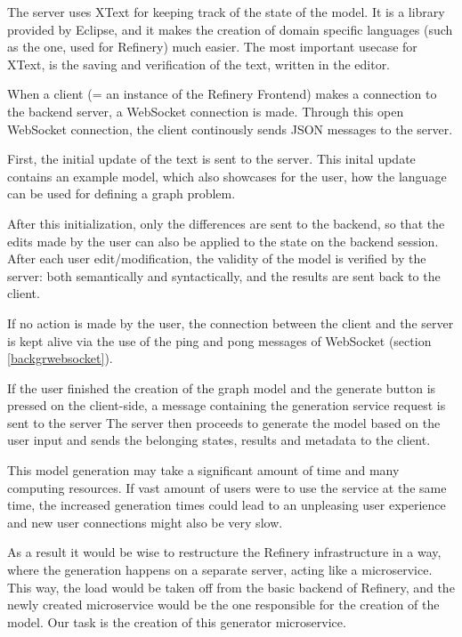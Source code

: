 	The server uses XText for keeping track of the state of the model. It is a library provided
	by Eclipse, and it makes the creation of domain specific languages (such as the one, used for Refinery)
	much easier. The most important usecase for XText, is the saving and verification of the text, 
	written in the editor.

	When a client (= an instance of the Refinery Frontend) makes a connection to the backend server, a WebSocket 
	connection is made. Through this open WebSocket connection, the client continously sends JSON messages to
	the server.

	First, the initial update of the text is sent to the server.
	This inital update contains an example model, which also showcases for the user, how the language can be used
	for defining a graph problem. 
	
	After this initialization, only the differences are sent to the backend, so that 
	the edits made by the user can also be applied to the state on the backend session. 
	After each user edit/modification, the
	validity of the model is verified by the server: both semantically and syntactically, and the results are 
	sent back to the client.

	If no action is made by the user, the connection between the client and the server
	is kept alive via the use of the ping and pong messages of WebSocket (section \ref{backgrwebsocket}).

	If the user finished the creation of the graph model and the generate button is pressed 
	on the client-side, a message containing the generation service request is sent to the server 
	The server then proceeds to generate the model based on the user input and sends the belonging 
	states, results and metadata to the client.

	This model generation may take a significant amount of time and many computing resources. 
	If vast amount of users were to use 
	the service at the same time, the increased generation times could lead to an unpleasing user experience and 
	new user connections might also be very slow. 
	
	As a result it would be wise to restructure the Refinery infrastructure in a way, 
	where the generation happens on a separate server,
	acting like a microservice. This way, the load would be taken off from 
	the basic backend of Refinery, and the newly created microservice would be the one responsible for
	the creation of the model.
	Our task is the creation of this generator microservice.

